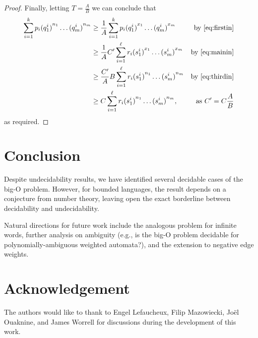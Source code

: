 \documentclass[10pt,a4paper]{amsart}
\numberwithin{equation}{section}
\theoremstyle{plain}
\theoremstyle{definition}
\theoremstyle{remark}
\begin{document}
\begin{proof}
Finally, letting $T=\frac{A}{B}$ we can conclude that
\begin{align*}
 \sum_{i=1}^{k} p_i{({q}^i_1)}^{n_1}\dots {({q}^i_m)}^{n_m} &\ge
\frac{1}{A}\sum_{i=1}^{k} p_i{({q}^i_1)}^{x_1}\dots {({q}^i_m)}^{x_m}
&\text{by \cref{eq:firstin}}
\\ & \ge\frac{1}{A}  C'\sum_{i=1}^{\ell} r_i{({s}^i_1)}^{x_1}\dots {({s}^i_m)}^{x_m}
&\text{by \cref{eq:mainin}}
\\ & \ge  \frac{ C'}{A}B \sum_{i=1}^{\ell} r_i{({s}^i_1)}^{n_1}\dots {({s}^i_m)}^{n_m}&\text{by \cref{eq:thirdin}}
\\ & \ge C \sum_{i=1}^{\ell} r_i{({s}^i_1)}^{n_1}\dots {({s}^i_m)}^{n_m},&\text{as $C' = C\frac{A}{B}$}
\end{align*}
as required.
\end{proof}


\section{Conclusion}
Despite undecidability results, we have identified several decidable cases of the big-O problem.
However, for  bounded languages, the result depends on a conjecture from number theory, leaving open the exact borderline between decidability
and undecidability.

Natural directions for future work include the analogous problem for infinite words, further analysis on ambiguity (e.g., is the big-O problem decidable for polynomially-ambiguous weighted automata?), and the extension to negative edge weights.

\section*{Acknowledgement}

The authors would like to thank to Engel Lefaucheux, Filip Mazowiecki, Jo\"el Ouaknine, and James Worrell for discussions during the development of this work.

 
\end{document}
